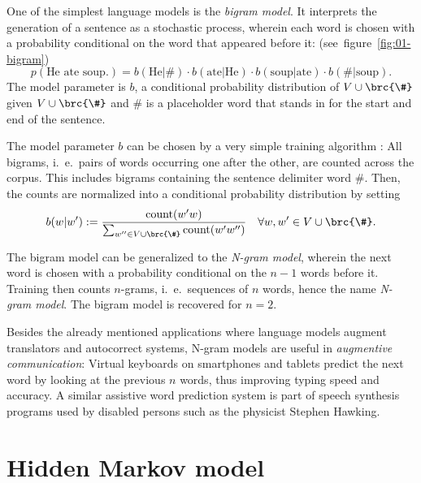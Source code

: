 One of the simplest language models is the \emph{bigram model}.
\cite{vogler2015} It interprets the generation of a sentence as a stochastic
process, wherein each word is chosen with a probability conditional on the word
that appeared before it: (see~figure~\ref{fig:01-bigram})
\[
 p(\text{He ate soup.}) = b(\text{He}|\#) \cdot b(\text{ate}|\text{He}) \cdot b(\text{soup}|\text{ate}) \cdot b(\#|\text{soup}).
\]
The model parameter is $b$, a conditional probability distribution of
$V\cup\brc{\#}$ given $V\cup\brc{\#}$ and $\#$ is a placeholder word
that stands in for the start and end of the sentence.

The model parameter $b$ can be chosen by a very simple training algorithm
\cite[pp.~123]{jm09}: All bigrams, i.~e.~pairs of words occurring one after the
other, are counted across the corpus. This includes bigrams containing the
sentence delimiter word $\#$. Then, the counts are normalized into a
conditional probability distribution by setting
\[
 b(w|w') := \frac{\operatorname{count}(w'w)}{\sum_{w''\in V\cup\brc{\#}} \operatorname{count}(w'w'')}
 \quad\forall w,w'\in V\cup\brc{\#}.
\]

The bigram model can be generalized to the \emph{N-gram model}, wherein the
next word is chosen with a probability conditional on the $n-1$ words before
it. Training then counts $n$-grams, i.~e.~sequences of $n$ words, hence the
name \emph{N-gram model}. The bigram model is recovered for $n=2$.

Besides the already mentioned applications where language models augment
translators and autocorrect systems, N-gram models are useful in
\emph{augmentive communication}: Virtual keyboards on smartphones and tablets
predict the next word by looking at the previous $n$ words, thus improving
typing speed and accuracy.  \cite{hasan2004n} A similar assistive word
prediction system is part of speech synthesis programs used by disabled persons
such as the physicist Stephen Hawking. \cite{newelletal1998}

\section{Hidden Markov model}

